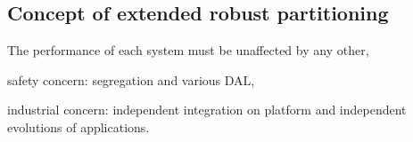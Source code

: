 \documentclass[10pt]{article}
\theoremstyle{plain}
\theoremstyle{definition}
\theoremstyle{remark}
\begin{document}
\subsection{Concept of extended robust partitioning}
The performance of each system must be unaffected by any other,
\begin{compactitem}
	\item safety concern: segregation and various DAL,
	\item industrial concern: independent integration on platform and
      independent evolutions of applications.
\end{compactitem}
\end{document}
